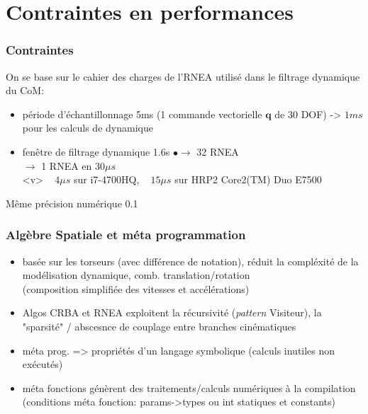 \documentclass[10pt]{beamer}
\begin{document}

\section{Contraintes en performances}

\begin{frame}
  \frametitle{Contraintes}

	On se base sur le cahier des charges de l'RNEA utilisé dans le filtrage dynamique du CoM:
	\begin{itemize}
	\item période d'échantillonnage 5ms (1 commande vectorielle $\mathbf{q}$ de 30 DOF) -> $1ms$ pour les calculs de dynamique
	\item fenêtre de filtrage dynamique 1.6s $•\longrightarrow$ 32 RNEA \\
	      $\longrightarrow$ 1 RNEA en $30\mu s$ \\
	      <v> ~ $4\mu s$ sur i7-4700HQ, ~ $15\mu s$ sur HRP2 Core2(TM) Duo E7500
	\end{itemize}
	
	Même précision numérique 0.1%
	
\end{frame}

\begin{frame}
  \frametitle{Algèbre Spatiale et méta programmation}
  
  \begin{itemize}
  \item basée sur les torseurs (avec différence de notation), réduit la compléxité de la modélisation dynamique, comb. translation/rotation \\
        (composition simplifiée des vitesses et accélérations)
  \item Algos CRBA et RNEA exploitent la récursivité (\emph{pattern} Visiteur), la "sparsité" / abscesnce de couplage entre branches cinématiques
  \item méta prog. => propriétés d'un langage symbolique (calculs inutiles non exécutés)
  \item méta fonctions génèrent des traitements/calculs numériques à la compilation \\
        (conditions méta fonction: params->types ou int statiques et constants)
  \end{itemize}
  
\end{frame}
\end{document}
